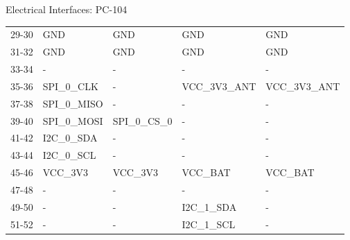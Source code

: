 \begin{frame}{Electrical Interfaces: PC-104}
\begin{table}[!h]
\begin{tabular}{cllll}
        29-30              & GND              & GND              & GND           & GND           \\
        31-32              & GND              & GND              & GND           & GND           \\
        33-34              & -                & -                & -             & -             \\
        35-36              & SPI\_0\_CLK      & -                & VCC\_3V3\_ANT & VCC\_3V3\_ANT \\
        37-38              & SPI\_0\_MISO     & -                & -             & -             \\
        39-40              & SPI\_0\_MOSI     & SPI\_0\_CS\_0    & -             & -             \\
        41-42              & I2C\_0\_SDA      & -                & -             & -             \\
        43-44              & I2C\_0\_SCL      & -                & -             & -             \\
        45-46              & VCC\_3V3         & VCC\_3V3         & VCC\_BAT      & VCC\_BAT      \\
        47-48              & -                & -                & -             & -             \\
        49-50              & -                & -                & I2C\_1\_SDA   & -             \\
        51-52              & -                & -                & I2C\_1\_SCL   & -             \\
        \bottomrule[1.5pt]
    \end{tabular}
    \label{tab:pc104-pins}
\end{table}

\end{frame}

